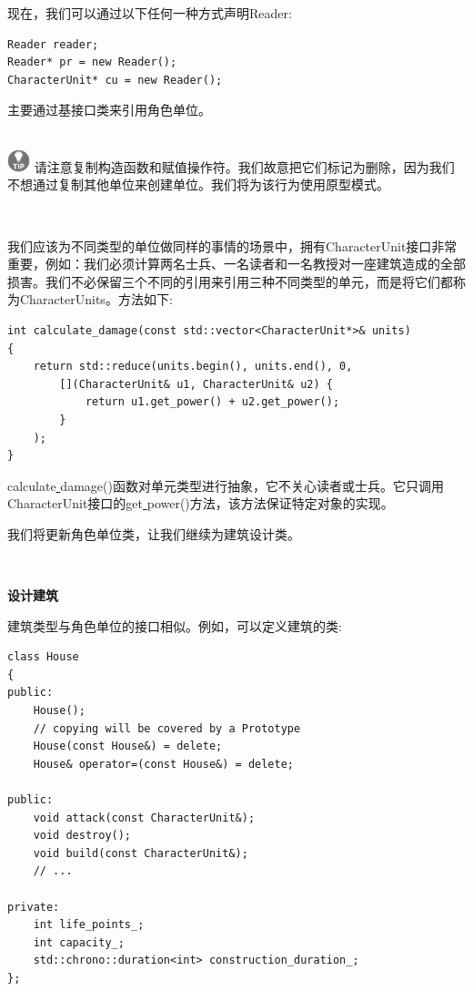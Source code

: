 现在，我们可以通过以下任何一种方式声明Reader: \par

\begin{lstlisting}[caption={}]
Reader reader;
Reader* pr = new Reader();
CharacterUnit* cu = new Reader();
\end{lstlisting}

主要通过基接口类来引用角色单位。 \par

\hspace*{\fill} \\ %
\includegraphics[width=0.05\textwidth]{images/tip}
请注意复制构造函数和赋值操作符。我们故意把它们标记为删除，因为我们不想通过复制其他单位来创建单位。我们将为该行为使用原型模式。 \par
\noindent\textbf{}\ \par

我们应该为不同类型的单位做同样的事情的场景中，拥有CharacterUnit接口非常重要，例如：我们必须计算两名士兵、一名读者和一名教授对一座建筑造成的全部损害。我们不必保留三个不同的引用来引用三种不同类型的单元，而是将它们都称为CharacterUnits。方法如下: \par

\begin{lstlisting}[caption={}]
int calculate_damage(const std::vector<CharacterUnit*>& units)
{
	return std::reduce(units.begin(), units.end(), 0,
		[](CharacterUnit& u1, CharacterUnit& u2) {
			return u1.get_power() + u2.get_power();
		}
	);
}
\end{lstlisting}

calculate\underline{ }damage()函数对单元类型进行抽象，它不关心读者或士兵。它只调用CharacterUnit接口的get\underline{ }power()方法，该方法保证特定对象的实现。\par
我们将更新角色单位类，让我们继续为建筑设计类。 \par

\noindent\textbf{}\ \par
\textbf{设计建筑} \ \par
建筑类型与角色单位的接口相似。例如，可以定义建筑的类: \par

\begin{lstlisting}[caption={}]
class House
{
public:
	House();
	// copying will be covered by a Prototype
	House(const House&) = delete;
	House& operator=(const House&) = delete;
	
public:
	void attack(const CharacterUnit&);
	void destroy();
	void build(const CharacterUnit&);
	// ...
	
private:
	int life_points_;
	int capacity_;
	std::chrono::duration<int> construction_duration_;
};
\end{lstlisting}

